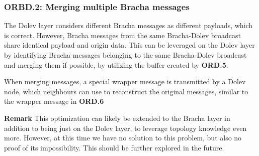 \subsubsection{ORBD.2: Merging multiple Bracha messages}
The Dolev layer considers different Bracha messages as different payloads, which is correct. However, Bracha messages from the same Bracha-Dolev broadcast share identical payload and origin data. This can be leveraged on the Dolev layer by identifying Bracha messages belonging to the same Bracha-Dolev broadcast and merging them if possible, by utilizing the buffer created by \textbf{ORD.5}.

When merging messages, a special wrapper message is transmitted by a Dolev node, which neighbours can use to reconstruct the original messages, similar to the wrapper message in \textbf{ORD.6}

\textbf{Remark}
This optimization can likely be extended to the Bracha layer in addition to being just on the Dolev layer, to leverage topology knowledge even more. However, at this time we have no solution to this problem, but also no proof of its impossibility. This should be further explored in the future.